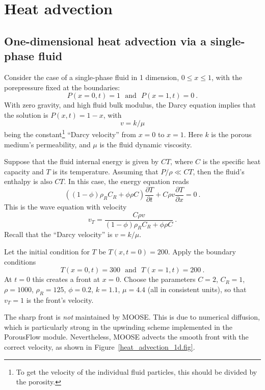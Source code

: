 \chapter{Heat advection}
\section{One-dimensional heat advection via a single-phase fluid}

Consider the case of a single-phase fluid in 1 dimension, $0\leq x
\leq 1$, with the porepressure fixed at the boundaries:
\begin{equation}
P(x=0, t) = 1 \ \ \ \mbox{and}\ \ \ P(x=1, t) = 0 \ .
\end{equation}
With zero gravity, and high fluid bulk modulus, the Darcy equation
implies that the solution is $P(x, t) = 1 - x$, with
\begin{equation}
v = k/\mu
\end{equation}
being the constant\footnote{To get the velocity of the individual
  fluid particles, this should be divided by the porosity.} ``Darcy
velocity'' from $x=0$ to $x=1$.  Here $k$ is the porous medium's
permeability, and $\mu$ is the fluid dynamic viscosity.

Suppose that the fluid internal energy is given by $CT$, where $C$ is
the specific heat capacity and $T$ is its temperature.  Assuming that
$P/\rho \ll CT$, then the fluid's enthalpy is also $CT$.  In this
case, the energy equation reads
\begin{equation}
\left((1 - \phi)\rho_{R}C_{R} + \phi\rho C \right) \frac{\partial
  T}{\partial t} + C \rho v \frac{\partial T}{\partial x} = 0 \ .
\end{equation}
This is the wave equation with velocity
\begin{equation}
v_{T} = \frac{C\rho v}{(1 - \phi)\rho_{R}C_{R} + \phi\rho C} \ .
\end{equation}
Recall that the ``Darcy velocity'' is $v=k/\mu$.

Let the initial condition for $T$ be $T(x, t=0) = 200$.  Apply the
boundary conditions
\begin{equation}
T(x=0, t) = 300 \ \ \ \mbox{and} \ \ \ T(x=1, t) = 200 \ .
\end{equation}
At $t=0$ this creates a front at $x=0$.  Choose the parameters $C=2$,
$C_{R}=1$, $\rho=1000$, $\rho_{R}=125$, $\phi=0.2$, $k=1.1$, $\mu=4.4$
(all in consistent units), so that $v_{T}=1$ is the front's velocity.

The sharp front is {\em not} maintained by
MOOSE.  This is due to numerical diffusion, which is particularly
strong in the upwinding scheme implemented in the PorousFlow module.
Nevertheless, MOOSE advects the smooth front with the correct
velocity, as shown in Figure~\ref{heat_advection_1d.fig}.

